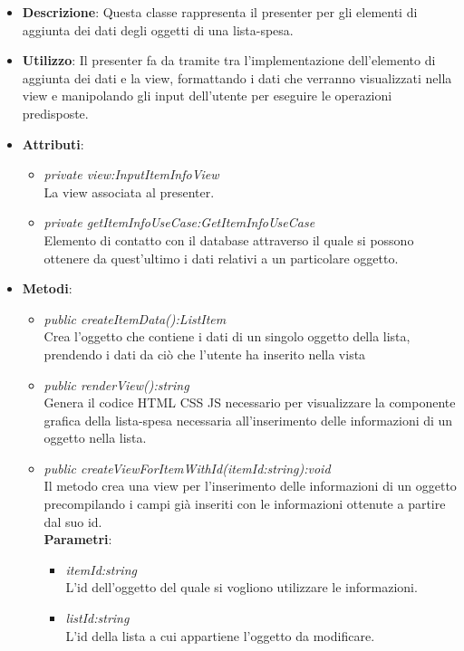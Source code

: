 \begin{itemize}
\item \textbf{Descrizione}: Questa classe rappresenta il presenter per gli elementi di aggiunta dei dati degli oggetti di una lista-spesa.
\item \textbf{Utilizzo}: Il presenter fa da tramite tra l'implementazione dell'elemento di aggiunta dei dati e la view, formattando i dati che verranno visualizzati nella view e manipolando gli input dell'utente per eseguire le operazioni predisposte.
\item \textbf{Attributi}: 
	\begin{itemize}
	\item \textit{private view:InputItemInfoView}\\
	La view associata al presenter.
	\item \textit{private getItemInfoUseCase:GetItemInfoUseCase}\\
	Elemento di contatto con il database attraverso il quale si possono ottenere da quest'ultimo i dati relativi a un particolare oggetto.
	\end{itemize}
\item \textbf{Metodi}:
	\begin{itemize}
	\item \textit{public createItemData():ListItem}\\
	Crea l'oggetto che contiene i dati di un singolo oggetto della lista, prendendo i dati da ciò che l'utente ha inserito nella vista
	\item \textit{public renderView():string}\\
	Genera il codice HTML CSS JS necessario per visualizzare la componente grafica della lista-spesa necessaria all'inserimento delle informazioni di un oggetto nella lista.
	\item \textit{public createViewForItemWithId(itemId:string):void}\\
	Il metodo crea una view per l'inserimento delle informazioni di un oggetto precompilando i campi già inseriti con le informazioni ottenute a partire dal suo id.
			\\ \textbf{Parametri}: \begin{itemize}
			\item \textit{itemId:string}\\
			L'id dell'oggetto del quale si vogliono utilizzare le informazioni.
			\item \textit{listId:string}\\
			L'id della lista a cui appartiene l'oggetto da modificare.

\end{itemize}
\end{itemize}
\end{itemize}
